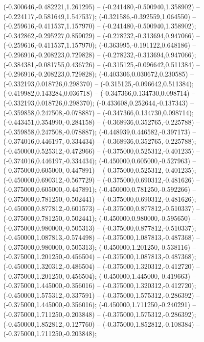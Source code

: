  (-0.300646,-0.482221,1.261295) -- (-0.241480,-0.500940,1.358902) -- (-0.224117,-0.581649,1.547537);
 (-0.321586,-0.392559,1.064550) -- (-0.259616,-0.411537,1.157970) -- (-0.241480,-0.500940,1.358902);
 (-0.342862,-0.295227,0.859029) -- (-0.278232,-0.313694,0.947066) -- (-0.259616,-0.411537,1.157970);
 (-0.363995,-0.191122,0.648186) -- (-0.296916,-0.208223,0.729828) -- (-0.278232,-0.313694,0.947066);
 (-0.384381,-0.081755,0.436726) -- (-0.315125,-0.096642,0.511384) -- (-0.296916,-0.208223,0.729828);
 (-0.403306,0.030672,0.230585) -- (-0.332193,0.018726,0.298370) -- (-0.315125,-0.096642,0.511384);
 (-0.419982,0.143284,0.036718) -- (-0.347366,0.134730,0.098714) -- (-0.332193,0.018726,0.298370);
 (-0.433608,0.252644,-0.137343) -- (-0.359858,0.247508,-0.078887) -- (-0.347366,0.134730,0.098714);
 (-0.443451,0.354990,-0.284158) -- (-0.368936,0.352765,-0.225788) -- (-0.359858,0.247508,-0.078887);
 (-0.448939,0.446582,-0.397173) -- (-0.374016,0.446197,-0.334434) -- (-0.368936,0.352765,-0.225788);
 (-0.450000,0.525312,-0.472966) -- (-0.375000,0.525312,-0.401235) -- (-0.374016,0.446197,-0.334434);
 (-0.450000,0.605000,-0.527963) -- (-0.375000,0.605000,-0.447891) -- (-0.375000,0.525312,-0.401235);
 (-0.450000,0.690312,-0.567729) -- (-0.375000,0.690312,-0.481626) -- (-0.375000,0.605000,-0.447891);
 (-0.450000,0.781250,-0.592266) -- (-0.375000,0.781250,-0.502441) -- (-0.375000,0.690312,-0.481626);
 (-0.450000,0.877812,-0.601573) -- (-0.375000,0.877812,-0.510337) -- (-0.375000,0.781250,-0.502441);
 (-0.450000,0.980000,-0.595650) -- (-0.375000,0.980000,-0.505313) -- (-0.375000,0.877812,-0.510337);
 (-0.450000,1.087813,-0.574498) -- (-0.375000,1.087813,-0.487368) -- (-0.375000,0.980000,-0.505313);
 (-0.450000,1.201250,-0.538116) -- (-0.375000,1.201250,-0.456504) -- (-0.375000,1.087813,-0.487368);
 (-0.450000,1.320312,-0.486504) -- (-0.375000,1.320312,-0.412720) -- (-0.375000,1.201250,-0.456504);
 (-0.450000,1.445000,-0.419663) -- (-0.375000,1.445000,-0.356016) -- (-0.375000,1.320312,-0.412720);
 (-0.450000,1.575312,-0.337591) -- (-0.375000,1.575312,-0.286392) -- (-0.375000,1.445000,-0.356016);
 (-0.450000,1.711250,-0.240291) -- (-0.375000,1.711250,-0.203848) -- (-0.375000,1.575312,-0.286392);
 (-0.450000,1.852812,-0.127760) -- (-0.375000,1.852812,-0.108384) -- (-0.375000,1.711250,-0.203848);
